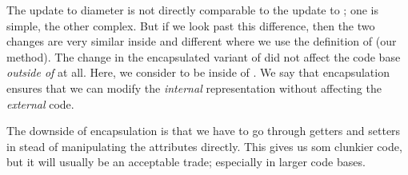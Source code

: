 The update to diameter is not directly comparable to the update to ; one is simple, the other complex. But if we look past this difference, then the two changes are very similar inside  and different where we use the definition of  (our  method). The change in the encapsulated variant of  did not affect the code base \textsl{outside of}  at all. Here, we consider  to be inside of . We say that encapsulation ensures that we can modify the \textsl{internal} representation without affecting the \textsl{external} code.

The downside of encapsulation is that we have to go through getters and setters in stead of manipulating the attributes directly. This gives us som clunkier code, but it will usually be an acceptable trade; especially in larger code bases.
